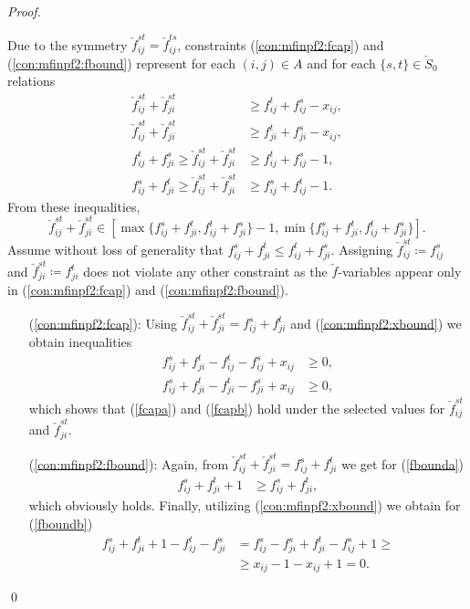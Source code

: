 \begin{proof}
\begin{itemize}[leftmargin=1cm]
\end{itemize}
Due to the symmetry $\check{f}^{st}_{ij} = \check{f}^{ts}_{ij}$, constraints (\ref{con:mfinpf2:fcap}) and (\ref{con:mfinpf2:fbound}) represent for each $(i,j)\in A$ and for each $\{s,t\}\in \check{S}_0$ relations
\begin{subequations}
\begin{align}
\label{fcapa}\check{f}^{st}_{ij} + \check{f}^{st}_{ji} &\geq f^t_{ij} + f^s_{ij}-x_{ij}, \\
\label{fcapb}\check{f}^{st}_{ij} + \check{f}^{st}_{ji} &\geq f^t_{ji} + f^s_{ji}-x_{ij}, \\
\label{fbounda}f^t_{ij}+ f^s_{ji}\geq\check{f}^{st}_{ij} + \check{f}^{st}_{ji} &\geq f^t_{ij} + f^s_{ij}-1, \\
\label{fboundb}f^s_{ij}+ f^t_{ji}\geq\check{f}^{st}_{ij} + \check{f}^{st}_{ji} &\geq f^s_{ij} + f^t_{ij}-1. 
\end{align}
\end{subequations}
From these inequalities,
$$
\check{f}^{st}_{ij} + \check{f}^{st}_{ji}\in\left[\max\{f^s_{ij}+f^t_{ji},f^t_{ij}+f^s_{ji}\}-1,\min\{f^s_{ij}+f^t_{ji},f^t_{ij}+f^s_{ji}\}\right].
$$
Assume without loss of generality that $f^s_{ij} + f^t_{ji}\leq f^t_{ij} + f^s_{ji}$. Assigning $\check{f}^{st}_{ij}\coloneqq f^s_{ij}$ and $\check{f}^{st}_{ji}\coloneqq f^t_{ji}$ does not violate any other constraint as the $\check{f}$-variables appear only in (\ref{con:mfinpf2:fcap}) and (\ref{con:mfinpf2:fbound}).
\begin{itemize}[leftmargin=1cm]
\item[(\ref{con:mfinpf2:fcap}):]  Using $\check{f}^{st}_{ij} + \check{f}^{st}_{ji} = f^{s}_{ij} + f^{t}_{ji}$ and (\ref{con:mfinpf2:xbound}) we obtain inequalities
\begin{align*}
f^{s}_{ij} + f^{t}_{ji}-f^t_{ij}-f^s_{ij}+x_{ij}&\geq 0,\\
f^{s}_{ij} + f^{t}_{ji}-f^t_{ji}-f^s_{ji}+x_{ij}&\geq 0,
\end{align*}
which shows that (\ref{fcapa}) and (\ref{fcapb}) hold under the selected values for $\check{f}^{st}_{ij}$ and $\check{f}^{st}_{ji}$.
\item[(\ref{con:mfinpf2:fbound}):] Again, from $\check{f}^{st}_{ij} + \check{f}^{st}_{ji} = f^{s}_{ij} + f^{t}_{ji}$  we get for (\ref{fbounda})
\begin{align*}
f^{s}_{ij} + f^{t}_{ji} + 1 &\geq f^s_{ij}+f^t_{ji},
\end{align*}
which obviously holds. Finally, utilizing (\ref{con:mfinpf2:xbound}) we obtain for (\ref{fboundb})
\begin{align*}
f^{s}_{ij} + f^{t}_{ji} + 1 -f^t_{ij}-f^s_{ji} &
= f^s_{ij}-f^s_{ji}+f^t_{ji}-f^s_{ij}+1 \geq \\
&\geq x_{ij}-1-x_{ij}+1=0.
\end{align*}
\end{itemize}\qed
\end{proof} 
